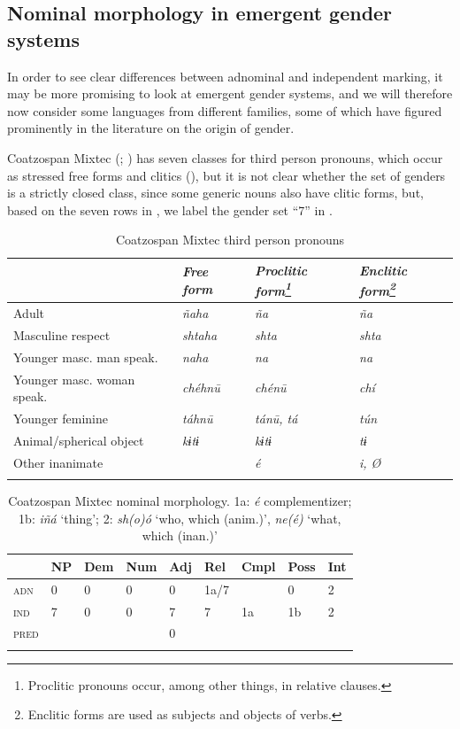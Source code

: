 \documentclass[output=collectionpaper]{langsci/langscibook}
\begin{document}
  \subsection{Nominal morphology in emergent gender systems}
  \label{sec:WDG:4.3}

In order to see clear differences between adnominal and independent marking, it may be more promising to look at emergent gender systems, and we will therefore now consider some languages from different families, some of which have figured prominently in the literature on the origin of gender.

Coatzospan Mixtec (; \citealt[415]{Small1990}) has seven classes for third person pronouns, which occur as stressed free forms and clitics (), but it is not clear whether the set of genders is a strictly closed class, since some generic nouns also have clitic forms, but, based on the seven rows in , we label the gender set ``7'' in .

\begin{table}
\begin{tabular}{l*{3}{>{\itshape}l}}
\lsptoprule
&	\normalfont Free form	&	\normalfont Proclitic form\footnote{Proclitic pronouns occur, among other things, in relative clauses.}	&	\normalfont Enclitic form\footnote{Enclitic forms are used as subjects and objects of verbs.}\\
\midrule
Adult	&	ñaha	&	ña	&	ña	\\
Masculine respect	&	shtaha	&	shta	&	shta	\\
Younger masc. man speak.	&	naha	&	na	&	na	\\
Younger masc. woman speak.	&	chéhnū	&	chénū	&	chí	\\
Younger feminine	&	táhnū	&	tánū, tá	&	tún	\\
Animal/spherical object	&	kɨtɨ	&	kɨtɨ	&	tɨ	\\
Other inanimate	&		&	é	&	i, Ø	\\
\lspbottomrule
\end{tabular}
\caption{Coatzospan Mixtec third person pronouns\label{tab:WDG:3}}
\end{table}


\begin{table}
\begin{tabular}{*{9}{l}}
\lsptoprule
&	NP	&	Dem	&	Num	&	Adj	&	Rel	&	Cmpl	&	Poss	&	Int	\\
\midrule
\textsc{adn}	&	0	&	0	&	0	&	0	&	1a/7	&		&	0	&	2	\\
\textsc{ind}	&	7	&	0	&	0	&	7	&	7	&	1a	&	1b	&	2	\\
\textsc{pred}	&		&		&		&	0	&		&		&		&		\\
\lspbottomrule
\end{tabular}
\caption{Coatzospan Mixtec nominal morphology. 1a: \textit{é} complementizer; 1b: \textit{iñá} `thing'; 2: \textit{sh(o)ó} `who, which (anim.)', \textit{ne(é)} `what, which (inan.)'\label{tab:WDG:4}}
\end{table}
\end{document}
